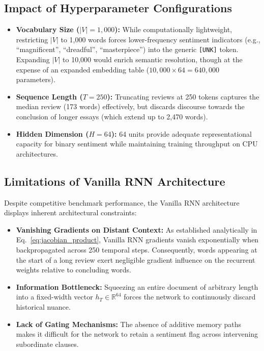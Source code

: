 \documentclass[11pt,a4paper]{article}
\begin{document}
\subsection{Impact of Hyperparameter Configurations}
\begin{itemize}
    \item \textbf{Vocabulary Size ($|V| = 1,000$):} While computationally lightweight, restricting $|V|$ to 1,000 words forces lower-frequency sentiment indicators (e.g., ``magnificent'', ``dreadful'', ``masterpiece'') into the generic \texttt{[UNK]} token. Expanding $|V|$ to 10,000 would enrich semantic resolution, though at the expense of an expanded embedding table ($10,000 \times 64 = 640,000$ parameters).
    \item \textbf{Sequence Length ($T = 250$):} Truncating reviews at 250 tokens captures the median review (173 words) effectively, but discards discourse towards the conclusion of longer essays (which extend up to 2,470 words).
    \item \textbf{Hidden Dimension ($H = 64$):} 64 units provide adequate representational capacity for binary sentiment while maintaining training throughput on CPU architectures.
\end{itemize}

\subsection{Limitations of Vanilla RNN Architecture}
Despite competitive benchmark performance, the Vanilla RNN architecture displays inherent architectural constraints:
\begin{itemize}
    \item \textbf{Vanishing Gradients on Distant Context:} As established analytically in Eq.~\ref{eq:jacobian_product}, Vanilla RNN gradients vanish exponentially when backpropagated across 250 temporal steps. Consequently, words appearing at the start of a long review exert negligible gradient influence on the recurrent weights relative to concluding words.
    \item \textbf{Information Bottleneck:} Squeezing an entire document of arbitrary length into a fixed-width vector $h_T \in \mathbb{R}^{64}$ forces the network to continuously discard historical nuance.
    \item \textbf{Lack of Gating Mechanisms:} The absence of additive memory paths makes it difficult for the network to retain a sentiment flag across intervening subordinate clauses.
\end{itemize}
\end{document}
